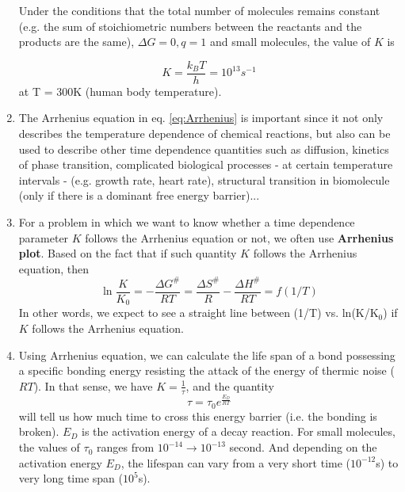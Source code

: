 \begin{enumerate}
  Under the conditions that the total number of molecules remains
  constant (e.g. the sum of stoichiometric numbers between the
  reactants and the products are the same), $\Delta G = 0, q=1$ and small molecules,
  the value of $K$ is

  \begin{equation}
    K = \frac{k_BT}{h} = 10^{13} s^{-1}
  \end{equation}
  at T = 300K (human body temperature).


\item The Arrhenius equation in eq. \eqref{eq:Arrhenius} is important since it not only
  describes the temperature dependence of chemical reactions, but also
  can be used to describe other time dependence quantities such as
  diffusion, kinetics of phase transition, complicated biological
  processes - at certain temperature intervals - (e.g. growth rate,
  heart rate), structural transition in biomolecule (only if there is
  a dominant free energy barrier)...

\item For a problem in which we want to know whether a time dependence
  parameter $K$ follows the Arrhenius equation or not, we often use
  {\bf Arrhenius plot}. Based on the fact that if such quantity $K$
  follows the Arrhenius equation, then 
  \begin{equation}
    \ln \frac{K}{K_0} = -\frac{\Delta G^\#}{RT} =  \frac{\Delta S^\#}{R} - \frac{\Delta H^\#}{RT} = f(1/T)
  \end{equation}
  In other words, we expect to see a straight line between (1/T)
  vs. ln(K/K$_0$) if $K$ follows the Arrhenius equation.


\item Using Arrhenius equation, we can calculate the life span of a
  bond possessing a specific bonding energy resisting the attack of the
  energy of thermic noise ($RT$). In that sense, we have $K =
  \frac{1}{\tau}$, and the quantity
  \begin{equation}
    \tau = \tau_0 e^{\frac{E_D}{RT}}
  \end{equation}
  will tell us how much time to cross this energy barrier (i.e. the
  bonding is broken). $E_D$ is the activation energy of a decay
  reaction. For small molecules, the values of $\tau_0$ ranges from
  $10^{-14} \rightarrow 10^{-13}$ second. And depending on the
  activation energy $E_D$, the lifespan can vary from a very short time
  ($10^{-12}$s) to very long time span ($10^5$s). 


\end{enumerate}
